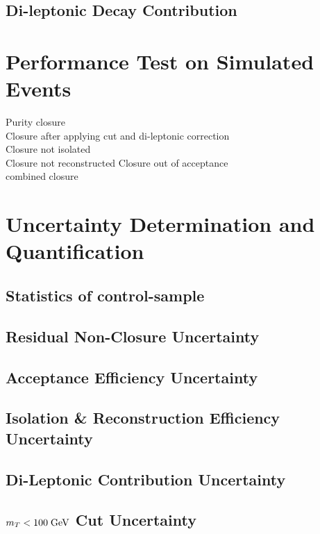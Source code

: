 \subsection{Di-leptonic \ttbar Decay Contribution}
\label{sec:Lost_Lepton_8TeV_Di_Lep}

\section{Performance Test on Simulated Events}
\todo Purity closure\\
\todo Closure after applying \mt cut and di-leptonic correction\\
\todo Closure not isolated\\
\todo Closure not reconstructed
\todo Closure out of acceptance\\
\todo combined closure\\

\section{Uncertainty Determination and Quantification}
\label{sec:Lost_Lepton_8TeV_Systematics}
\subsection{Statistics of control-sample}
\label{sec:Lost_Lepton_8TeV_Systematics_stats}
\subsection{Residual Non-Closure Uncertainty}
\label{sec:Lost_Lepton_8TeV_Systematics_non-closure}
\subsection{Acceptance Efficiency Uncertainty}
\label{sec:Lost_Lepton_8TeV_Systematics_acc}
\subsection{Isolation \& Reconstruction Efficiency Uncertainty}
\label{sec:Lost_Lepton_8TeV_Systematics_iso_reco}
\subsection{Di-Leptonic Contribution Uncertainty}
\label{sec:Lost_Lepton_8TeV_Systematics_di-lep}
\subsection{$m_{T}<100\;\text{Ge}\kern-0.06667em\text{V}$ Cut Uncertainty}
\label{sec:Lost_Lepton_8TeV_Systematics_mtw}
